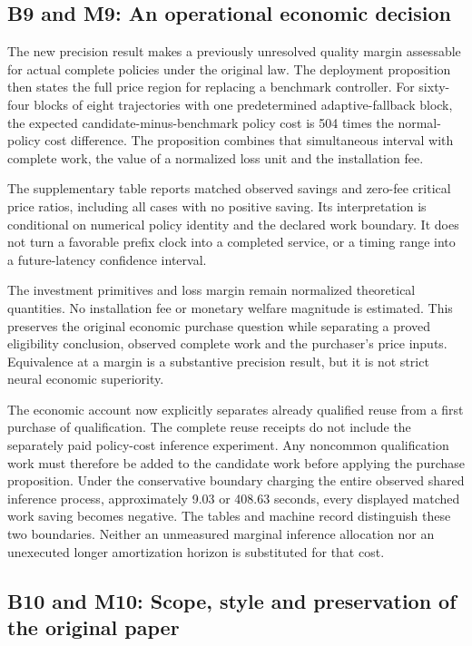 \documentclass[ecta,nameyear,draft]{econsocart}
\begin{document}
\hypertarget{b9-and-m9-an-operational-economic-decision}{%
\subsection{B9 and M9: An operational economic
decision}\label{b9-and-m9-an-operational-economic-decision}}

The new precision result makes a previously unresolved quality margin
assessable for actual complete policies under the original law. The
deployment proposition then states the full price region for replacing a
benchmark controller. For sixty-four blocks of eight trajectories with
one predetermined adaptive-fallback block, the expected
candidate-minus-benchmark policy cost is 504 times the normal-policy
cost difference. The proposition combines that simultaneous interval
with complete work, the value of a normalized loss unit and the
installation fee.

The supplementary table reports matched observed savings and zero-fee
critical price ratios, including all cases with no positive saving. Its
interpretation is conditional on numerical policy identity and the
declared work boundary. It does not turn a favorable prefix clock into a
completed service, or a timing range into a future-latency confidence
interval.

The investment primitives and loss margin remain normalized theoretical
quantities. No installation fee or monetary welfare magnitude is
estimated. This preserves the original economic purchase question while
separating a proved eligibility conclusion, observed complete work and
the purchaser's price inputs. Equivalence at a margin is a substantive
precision result, but it is not strict neural economic superiority.

The economic account now explicitly separates already qualified reuse
from a first purchase of qualification. The complete reuse receipts do
not include the separately paid policy-cost inference experiment. Any
noncommon qualification work must therefore be added to the candidate
work before applying the purchase proposition. Under the conservative
boundary charging the entire observed shared inference process,
approximately 9.03 or 408.63 seconds, every displayed matched work
saving becomes negative. The tables and machine record distinguish these
two boundaries. Neither an unmeasured marginal inference allocation nor
an unexecuted longer amortization horizon is substituted for that cost.

\hypertarget{b10-and-m10-scope-style-and-preservation-of-the-original-paper}{%
\subsection{B10 and M10: Scope, style and preservation of the original
paper}\label{b10-and-m10-scope-style-and-preservation-of-the-original-paper}}
\end{document}
